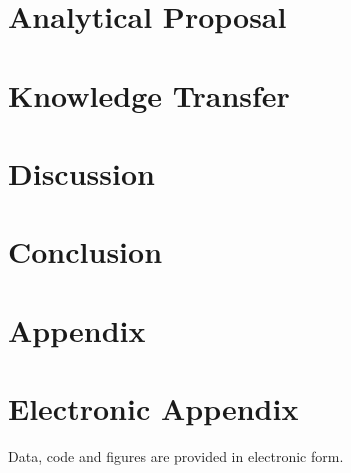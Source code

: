 \documentclass[12pt]{article}
\begin{document}
\section{Analytical Proposal}
\label{analysis}


\section{Knowledge Transfer}
\label{teaching}


\section{Discussion}
\label{discussion}


\section{Conclusion}
\label{conclusion}


\newpage

    


\setcounter{page}{5}

\appendix

\section{Appendix}
\label{app}
% 
\newpage

\section{Electronic Appendix}
\label{el_app}

Data, code and figures are provided in electronic form.

\newpage
    
\end{document}
